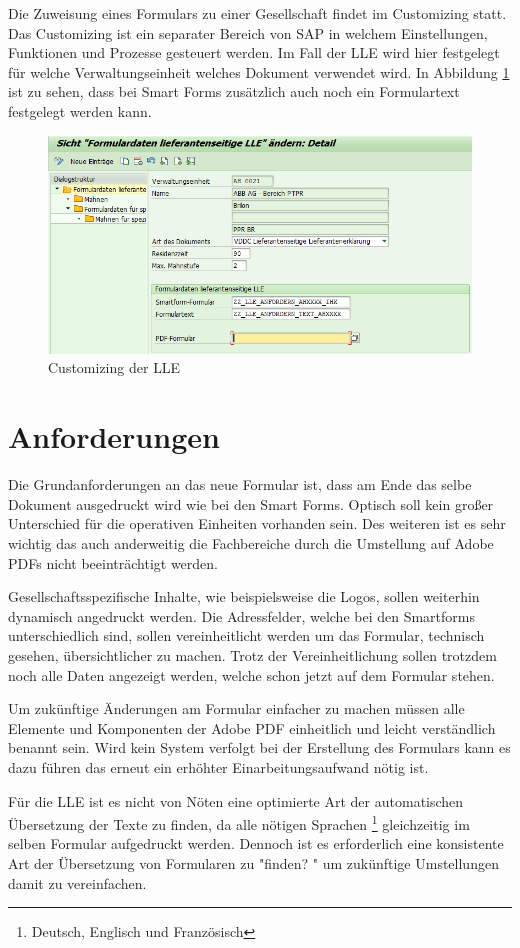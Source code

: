 	Die Zuweisung eines Formulars zu einer Gesellschaft findet im Customizing statt. Das Customizing ist ein separater Bereich von SAP in welchem Einstellungen, Funktionen und Prozesse gesteuert werden. Im Fall der \ac{LLE} wird hier festgelegt für welche Verwaltungseinheit welches Dokument verwendet wird. In Abbildung \ref{fig4} ist zu sehen, dass bei Smart Forms zusätzlich auch noch ein Formulartext festgelegt werden kann.
	
			
		\begin{figure}
		\includegraphics[width=1\textwidth]{img/Customizing.png}	
		\caption{Customizing der \ac{LLE}}
		\label{fig4}
	\end{figure}

	\FloatBarrier

	\section{Anforderungen}
		Die Grundanforderungen an das neue Formular ist, dass am Ende das selbe Dokument ausgedruckt wird wie bei den Smart Forms. Optisch soll kein großer Unterschied für die operativen Einheiten vorhanden sein. Des weiteren ist es sehr wichtig das auch anderweitig die Fachbereiche durch die Umstellung auf Adobe PDFs nicht beeinträchtigt werden.
	
		Gesellschaftsspezifische Inhalte, wie beispielsweise die Logos, sollen weiterhin dynamisch angedruckt werden.
		Die Adressfelder, welche bei den Smartforms unterschiedlich sind, sollen vereinheitlicht werden um das Formular, technisch gesehen, übersichtlicher zu machen. Trotz der Vereinheitlichung sollen trotzdem noch alle Daten angezeigt werden, welche schon jetzt auf dem Formular stehen. 
		
		Um zukünftige Änderungen am Formular einfacher zu machen müssen alle Elemente und Komponenten der Adobe \ac{PDF} einheitlich und leicht verständlich benannt sein. Wird kein System verfolgt bei der Erstellung des Formulars kann es dazu führen das erneut ein erhöhter Einarbeitungsaufwand nötig ist.
		
		Für die \ac{LLE} ist es nicht von Nöten eine optimierte Art der automatischen Übersetzung der Texte zu finden, da alle nötigen Sprachen \footnote{Deutsch, Englisch und Französisch} gleichzeitig im selben Formular aufgedruckt werden.
		Dennoch ist es erforderlich eine konsistente Art der Übersetzung von Formularen zu "finden? " um zukünftige Umstellungen damit zu vereinfachen.
